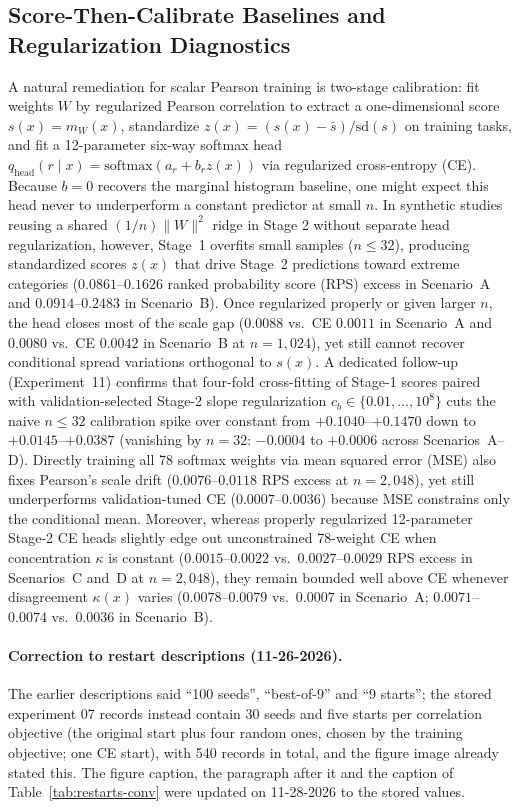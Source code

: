 \subsection{Score-Then-Calibrate Baselines and Regularization Diagnostics}
A natural remediation for scalar Pearson training is two-stage calibration: fit weights $W$ by regularized Pearson correlation to extract a one-dimensional score $s(x) = m_W(x)$, standardize $z(x) = (s(x) - \bar{s}) / \mathrm{sd}(s)$ on training tasks, and fit a 12-parameter six-way softmax head $q_{\mathrm{head}}(r \mid x) = \mathrm{softmax}(a_r + b_r z(x))$ via regularized cross-entropy (CE).
Because $b = 0$ recovers the marginal histogram baseline, one might expect this head never to underperform a constant predictor at small $n$.
In synthetic studies reusing a shared $(1/n)\|W\|^2$ ridge in Stage 2 without separate head regularization, however, Stage~1 overfits small samples ($n \le 32$), producing standardized scores $z(x)$ that drive Stage~2 predictions toward extreme categories ($0.0861$--$0.1626$ ranked probability score (RPS) excess in Scenario~A and $0.0914$--$0.2483$ in Scenario~B).
Once regularized properly or given larger $n$, the head closes most of the scale gap ($0.0088$ vs.\ CE $0.0011$ in Scenario~A and $0.0080$ vs.\ CE $0.0042$ in Scenario~B at $n=1{,}024$), yet still cannot recover conditional spread variations orthogonal to $s(x)$.
A dedicated follow-up (Experiment~11) confirms that four-fold cross-fitting of Stage-1 scores paired with validation-selected Stage-2 slope regularization $c_b \in \{0.01, \dots, 10^8\}$ cuts the naive $n \le 32$ calibration spike over constant from $+0.1040$--$+0.1470$ down to $+0.0145$--$+0.0387$ (vanishing by $n=32$: $-0.0004$ to $+0.0006$ across Scenarios~A--D).
Directly training all 78 softmax weights via mean squared error (MSE) also fixes Pearson's scale drift ($0.0076$--$0.0118$ RPS excess at $n=2{,}048$), yet still underperforms validation-tuned CE ($0.0007$--$0.0036$) because MSE constrains only the conditional mean.
Moreover, whereas properly regularized 12-parameter Stage-2 CE heads slightly edge out unconstrained 78-weight CE when concentration $\kappa$ is constant ($0.0015$--$0.0022$ vs.\ $0.0027$--$0.0029$ RPS excess in Scenarios~C and~D at $n=2{,}048$), they remain bounded well above CE whenever disagreement $\kappa(x)$ varies ($0.0078$--$0.0079$ vs.\ $0.0007$ in Scenario~A; $0.0071$--$0.0074$ vs.\ $0.0036$ in Scenario~B).

\paragraph{Correction to restart descriptions (11-26-2026).}
The earlier descriptions said ``100 seeds'', ``best-of-9'' and ``9 starts''; the stored experiment 07 records instead contain 30 seeds and five starts per correlation objective (the original start plus four random ones, chosen by the training objective; one CE start), with 540 records in total, and the figure image already stated this.
The figure caption, the paragraph after it and the caption of Table~\ref{tab:restarts-conv} were updated on 11-28-2026 to the stored values.

